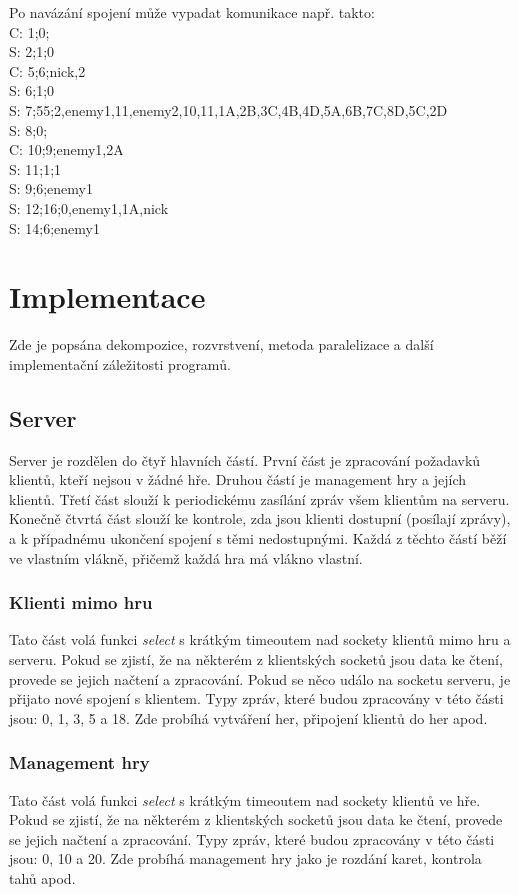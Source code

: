 \documentclass[12pt, a4paper]{article}
\begin{document}
		Po navázání spojení může vypadat komunikace např. takto:\\
		C: 1;0;\\
		S: 2;1;0\\
		C: 5;6;nick,2\\
		S: 6;1;0\\
		S: 7;55;2,enemy1,11,enemy2,10,11,1A,2B,3C,4B,4D,5A,6B,7C,8D,5C,2D\\
		S: 8;0;\\
		C: 10;9;enemy1,2A\\
		S: 11;1;1\\
		S: 9;6;enemy1\\
		S: 12;16;0,enemy1,1A,nick\\
		S: 14;6;enemy1
		
	\section{Implementace}
	Zde je popsána dekompozice, rozvrstvení, metoda paralelizace a další implementační záležitosti programů.
	
		\subsection{Server}
		Server je rozdělen do čtyř hlavních částí. První část je zpracování požadavků klientů, kteří nejsou v žádné hře. Druhou částí je management hry a jejích klientů. Třetí část slouží k periodickému zasílání  zpráv všem klientům na serveru. Konečně čtvrtá část slouží ke kontrole, zda jsou klienti dostupní (posílají  zprávy), a k případnému ukončení spojení s těmi nedostupnými. Každá z těchto částí běží ve vlastním vlákně, přičemž každá hra má vlákno vlastní.
		
			\subsubsection{Klienti mimo hru}
			Tato část volá funkci \emph{select} s krátkým timeoutem nad sockety klientů mimo hru a serveru. Pokud se zjistí, že na některém z klientských socketů jsou data ke čtení, provede se jejich načtení a zpracování. Pokud se něco událo na socketu serveru, je přijato nové spojení s klientem. Typy zpráv, které budou zpracovány v této části jsou: 0, 1, 3, 5 a 18. Zde probíhá vytváření her, připojení klientů do her apod.
			
			\subsubsection{Management hry}
			Tato část volá funkci \emph{select} s krátkým timeoutem nad sockety klientů ve hře. Pokud se zjistí, že na některém z klientských socketů jsou data ke čtení, provede se jejich načtení a zpracování. Typy zpráv, které budou zpracovány v této části jsou: 0, 10 a 20. Zde probíhá management hry jako je rozdání karet, kontrola tahů apod.
			
\end{document}

